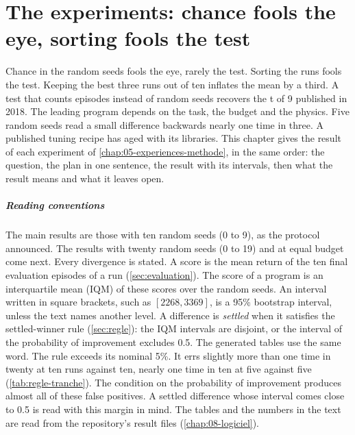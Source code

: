 \chapter{The experiments: chance fools the eye, sorting fools the test}\label{chap:06-experiences-resultats}

Chance in the random seeds fools the eye, rarely the test. Sorting the runs fools the test. Keeping the best
three runs out of ten inflates the mean by a third. A test that counts episodes instead of random seeds
recovers the t of 9 published in 2018. The leading program depends on the task, the budget and the physics.
Five random seeds read a small difference backwards nearly one time in three. A published tuning recipe has
aged with its libraries. This chapter gives the result of each experiment of \cref{chap:05-experiences-methode},
in the same order: the question, the plan in one sentence, the result with its intervals, then what the
result means and what it leaves open.

\paragraph{Reading conventions}
The main results are those with ten random seeds (0 to 9), as the protocol announced. The results with twenty
random seeds (0 to 19) and at equal budget come next. Every divergence is stated. A score is the mean return
of the ten final evaluation episodes of a run (\cref{sec:evaluation}). The score of a program is an
interquartile mean (IQM) of these scores over the random seeds. An interval written in square brackets, such
as $[\num{2268}, \num{3369}]$, is a 95\% bootstrap interval, unless the text names another level. A difference
is \emph{settled} when it satisfies the settled-winner rule (\cref{sec:regle}): the IQM intervals are disjoint,
or the interval of the probability of improvement excludes 0.5. The generated tables use the same word. The
rule exceeds its nominal 5\%. It errs slightly more than one time in twenty at ten runs against ten, nearly
one time in ten at five against five (\cref{tab:regle-tranche}). The condition on
the probability of improvement produces almost all of these false positives. A settled difference whose interval
comes close to 0.5 is read with this margin in mind. The tables and the numbers in the text are read from
the repository's result files (\cref{chap:08-logiciel}).


